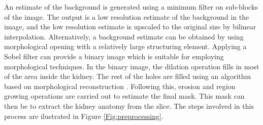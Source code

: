 An estimate of the background is generated using a minimum filter on sub-blocks of the image. The output is a low resolution estimate of the background in the image, and the low resolution estimate is upscaled to the original size by bilinear interpolation. Alternatively, a background estimate can be obtained by using morphological opening with a relatively large structuring element. Applying a Sobel filter \cite{DIP1} can provide a binary image which is suitable for employing morphological techniques. In the binary image, the dilation operation fills in most of the area inside the kidney. The rest of the holes are filled using an algorithm based on morphological reconstruction \cite{DIP2}. Following this, erosion and region growing operations are carried out to estimate the final mask. This mask can then be to extract the kidney anatomy from the slice. The steps involved in this process are ilustrated in Figure \ref{Fig:preprocessing}. 

